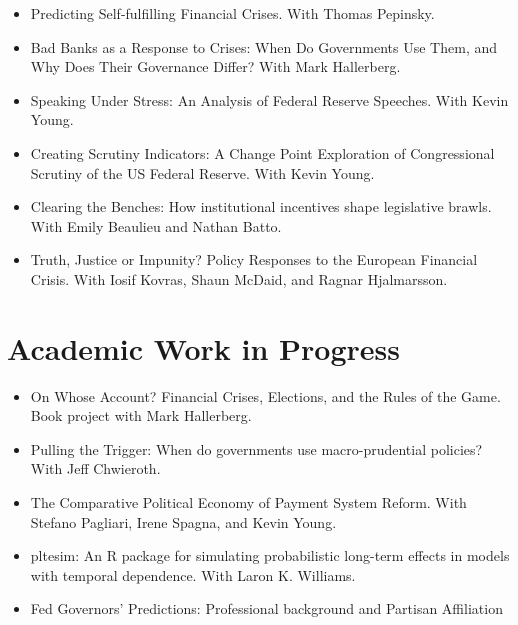 \documentclass[a4paper]{article}
\begin{document}
\begin{itemize}

    \item Predicting Self-fulfilling Financial Crises. With Thomas Pepinsky.

    \item Bad Banks as a Response to Crises: When Do Governments Use Them, and Why Does Their Governance Differ? With Mark Hallerberg.

    \item Speaking Under Stress: An Analysis of Federal Reserve Speeches. With Kevin Young.

    \item Creating Scrutiny Indicators: A Change Point Exploration of Congressional Scrutiny of the US Federal Reserve. With Kevin Young.

    \item Clearing the Benches: How institutional incentives shape legislative brawls. With Emily Beaulieu and Nathan Batto.

    \item Truth, Justice or Impunity? Policy Responses to the European Financial Crisis. With Iosif Kovras, Shaun McDaid, and Ragnar Hjalmarsson.

\end{itemize}

\section*{Academic Work in Progress}

\begin{itemize}

    \item On Whose Account? Financial Crises, Elections, and the Rules of the Game. Book project with Mark Hallerberg.

    \item Pulling the Trigger: When do governments use macro-prudential policies? With Jeff Chwieroth.

    \item The Comparative Political Economy of Payment System Reform. With Stefano Pagliari, Irene Spagna, and Kevin Young.

    \item pltesim: An R package for simulating probabilistic long-term effects in models with temporal dependence. With Laron K. Williams.

    \item Fed Governors' Predictions: Professional background and Partisan Affiliation

\end{itemize}
\end{document}
